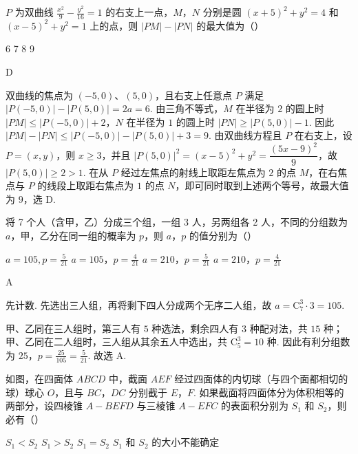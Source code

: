 \begin{problem}
\(P\) 为双曲线 \(\frac{x^2}{9} - \frac{y^2}{16} = 1\) 的右支上一点，\(M\)，\(N\) 分别是圆 \((x + 5)^2 + y^2 = 4\) 和 \((x - 5)^2 + y^2 = 1\) 上的点，则 \(|PM| - |PN|\) 的最大值为（\quad）

\choices
    {6}
    {7}
    {8}
    {9}
\end{problem}

\begin{answer}
D
\end{answer}

\begin{solution}
双曲线的焦点为 \((-5,0)\)、\((5,0)\)，且右支上任意点 \(P\) 满足 \(|P(-5,0)|-|P(5,0)|=2a=6\). 由三角不等式，\(M\) 在半径为 \(2\) 的圆上时 \(|PM|\leqslant|P(-5,0)|+2\)，\(N\) 在半径为 \(1\) 的圆上时 \(|PN|\geqslant|P(5,0)|-1\). 因此
\(|PM|-|PN|\leqslant|P(-5,0)|-|P(5,0)|+3=9\). 由双曲线方程且 \(P\) 在右支上，设 \(P=(x,y)\)，则 \(x\geqslant3\)，并且
\(|P(5,0)|^2=(x-5)^2+y^2=\dfrac{(5x-9)^2}{9}\)，故 \(|P(5,0)|\geqslant2>1\). 在从 \(P\) 经过左焦点的射线上取距左焦点为 \(2\) 的点 \(M\)，在右焦点与 \(P\) 的线段上取距右焦点为 \(1\) 的点 \(N\)，即可同时取到上述两个等号，故最大值为 \(9\)，选 D.
\end{solution}

\begin{problem}
将 7 个人（含甲，乙）分成三个组，一组 3 人，另两组各 2 人，不同的分组数为 \(a\)，甲，乙分在同一组的概率为 \(p\)，则 \(a\)，\(p\) 的值分别为（\quad）

\choices
    {\(a = 105, p = \frac{5}{21}\)}
    {\(a = 105\)，\(p = \frac{4}{21}\)}
    {\(a = 210\)，\(p = \frac{5}{21}\)}
    {\(a = 210\)，\(p = \frac{4}{21}\)}
\end{problem}

\begin{answer}
A
\end{answer}

\begin{solution}
先计数. 先选出三人组，再将剩下四人分成两个无序二人组，故 \(a=\mathrm C_7^3\cdot3=105\).

甲、乙同在三人组时，第三人有 \(5\) 种选法，剩余四人有 \(3\) 种配对法，共 \(15\) 种；甲、乙同在二人组时，三人组从其余五人中选出，共 \(\mathrm C_5^3=10\) 种. 因此有利分组数为 \(25\)，\(p=\frac{25}{105}=\frac{5}{21}\). 故选 A.
\end{solution}

\begin{problem}
如图，在四面体 \(ABCD\) 中，截面 \(AEF\) 经过四面体的内切球（与四个面都相切的球）球心 \(O\)，且与 \(BC\)，\(DC\) 分别截于 \(E\)，\(F\). 如果截面将四面体分为体积相等的两部分，设四棱锥 \(A-BEFD\) 与三棱锥 \(A-EFC\) 的表面积分别为 \(S_1\) 和 \(S_2\)，则必有（\quad）


\choices
    {\(S_{1} < S_{2}\)}
    {\(S_{1} > S_{2}\)}
    {\(S_{1} = S_{2}\)}
    {\(S_{1}\) 和 \(S_{2}\) 的大小不能确定}
\end{problem}

